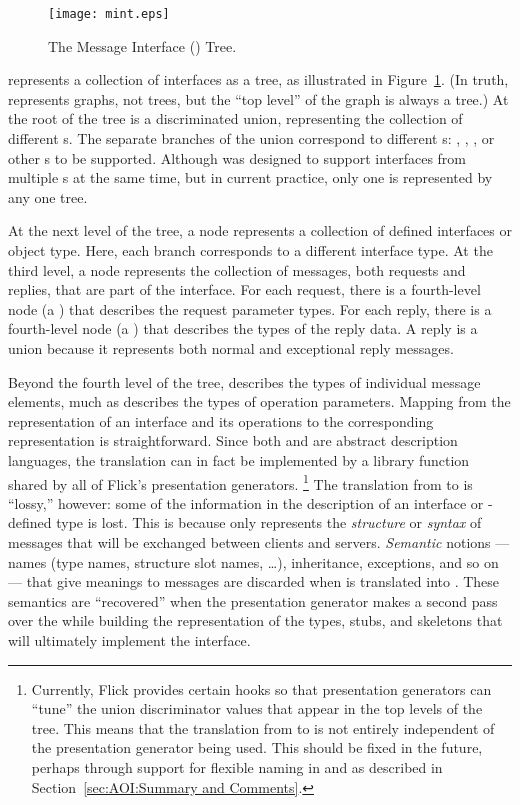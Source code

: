 \begin{figure}
  \centering
  \texttt{[image: mint.eps]}
  \caption{The Message Interface (\MINT{}) Tree.}
  \label{fig:MINT:The MINT Tree}
\end{figure}

\MINT{} represents a collection of interfaces as a tree, as illustrated in
Figure~\ref{fig:MINT:The MINT Tree}.  (In truth, \MINT{} represents graphs, not
trees, but the ``top level'' of the graph is always a tree.)  At the root of
the tree is a discriminated union, representing the collection of different
\IDL{}s.  The separate branches of the union correspond to different \IDL{}s:
\CORBA{}, \ONCRPC{}, \MIG{}, or other \IDL{}s to be supported.  Although
\MINT{} was designed to support interfaces from multiple \IDL{}s at the same
time, but in current practice, only one \IDL{} is represented by any one
\MINT{} tree.

At the next level of the tree, a node represents a collection of defined
interfaces or object type.  Here, each branch corresponds to a different
interface type.  At the third level, a \MINT{} node represents the collection
of messages, both requests and replies, that are part of the interface.  For
each request, there is a fourth-level node (a ) that describes
the request parameter types.  For each reply, there is a fourth-level node (a
) that describes the types of the reply data.  A reply is a
union because it represents both normal and exceptional reply messages.

Beyond the fourth level of the tree, \MINT{} describes the types of individual
message elements, much as \AOI{} describes the types of \IDL{} operation
parameters.  Mapping from the \AOI{} representation of an interface and its
operations to the corresponding \MINT{} representation is straightforward.
Since both \AOI{} and \MINT{} are abstract description languages, the
translation can in fact be implemented by a library function shared by all of
Flick's presentation generators.%
%
\footnote{Currently, Flick provides certain hooks so that presentation
generators can ``tune'' the union discriminator values that appear in the top
levels of the \MINT{} tree.  This means that the translation from \AOI{} to
\MINT{} is not entirely independent of the presentation generator being used.
This should be fixed in the future, perhaps through support for flexible naming
in \AOI{} and \MINT{} as described in Section~\ref{sec:AOI:Summary and
Comments}.}
%
The translation from \AOI{} to \MINT{} is ``lossy,'' however: some of the
information in the \AOI{} description of an interface or \IDL{}-defined type is
lost.  This is because \MINT{} only represents the \emph{structure} or
\emph{syntax} of messages that will be exchanged between clients and servers.
\emph{Semantic} notions --- names (type names, structure slot names, \ldots{}),
inheritance, exceptions, and so on --- that give meanings to messages are
discarded when \AOI{} is translated into \MINT{}\@.  These semantics are
``recovered'' when the presentation generator makes a second pass over the
\AOI{} while building the \PRESC{} representation of the types, stubs, and
skeletons that will ultimately implement the interface.

